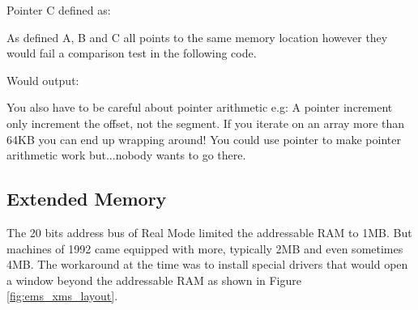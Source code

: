 \documentclass[book.tex]{subfiles}
\begin{document}
\bigskip

Pointer C defined as:\\
\par
\begin{minipage}{\textwidth}

\end{minipage}

As defined A, B and C all points to the same memory location however they would fail a comparison test in the following code.\\

\begin{minipage}{\textwidth}

\end{minipage}
Would output:\\

\begin{minipage}{\textwidth}

\end{minipage}
\par

You also have to be careful about pointer arithmetic e.g: A  pointer increment only increment the offset, not the segment. If you iterate on an array more than 64KB you can end up wrapping around! You could use  pointer to make pointer arithmetic work but...nobody wants to go there.




  \subsection{Extended Memory}

The 20 bits address bus of Real Mode limited the addressable RAM to 1MB. But machines of 1992 came equipped with more, typically 2MB and even sometimes 4MB. The workaround at the time was to install special drivers that would open a window beyond the addressable RAM as shown in Figure \ref{fig:ems_xms_layout}.
\end{document}
